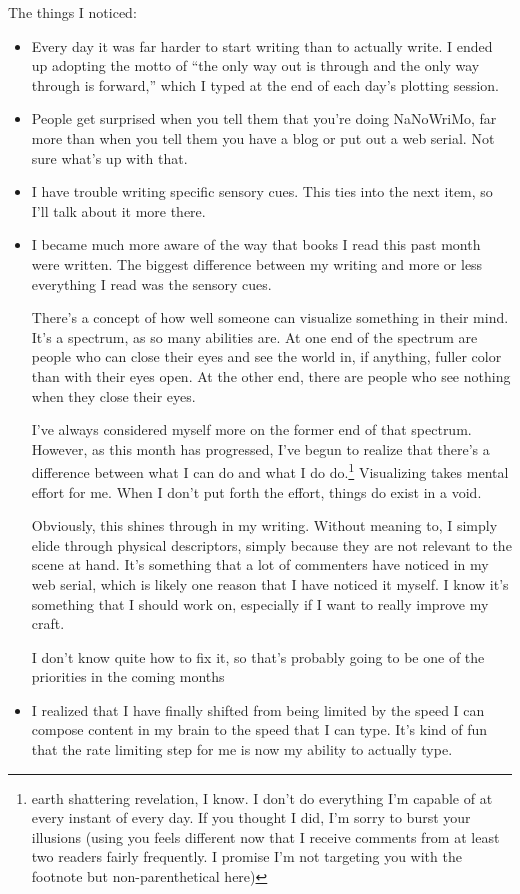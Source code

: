 \documentclass[12pt]{article}[titlepage]
\newcommand{\say}[1]{``#1''}
\newcommand{\1}{\={a}}
\newcommand{\2}{\={e}}
\newcommand{\3}{\={\i}}
\newcommand{\4}{\=o}
\newcommand{\5}{\=u}
\newcommand{\6}{\={A}}
\renewcommand{\,}{\textsuperscript{,}}
\begin{document}
The things I noticed:
\begin{itemize}
\item Every day it was far harder to start writing than to actually write.
I ended up adopting the motto of \say{the only way out is through and the only way through is forward,} which I typed at the end of each day's plotting session.
\item People get surprised when you tell them that you're doing NaNoWriMo, far more than when you tell them you have a blog or put out a web serial. Not sure what's up with that.
\item I have trouble writing specific sensory cues. This ties into the next item, so I'll talk about it more there.
\item I became much more aware of the way that books I read this past month were written.
The biggest difference between my writing and more or less everything I read was the sensory cues.
 
There's a concept of how well someone can visualize something in their mind.
It's a spectrum, as so many abilities are.
At one end of the spectrum are people who can close their eyes and see the world in, if anything, fuller color than with their eyes open.
At the other end, there are people who see nothing when they close their eyes.
 
I've always considered myself more on the former end of that spectrum.
However, as this month has progressed, I've begun to realize that there's a difference between what I can do and what I do do.\footnote{earth shattering revelation, I know. I don't do everything I'm capable of at every instant of every day.
If you thought I did, I'm sorry to burst your illusions (using you feels different now that I receive comments from at least two readers fairly frequently. I promise I'm not targeting you with the footnote but non-parenthetical here)}
Visualizing takes mental effort for me.
When I don't put forth the effort, things do exist in a void.
 
Obviously, this shines through in my writing.
Without meaning to, I simply elide through physical descriptors, simply because they are not relevant to the scene at hand.
It's something that a lot of commenters have noticed in my web serial, which is likely one reason that I have noticed it myself.
I know it's something that I should work on, especially if I want to really improve my craft.
 
I don't know quite how to fix it, so that's probably going to be one of the priorities in the coming months
\item I realized that I have finally shifted from being limited by the speed I can compose content in my brain to the speed that I can type.
It's kind of fun that the rate limiting step for me is now my ability to actually type.
 

\end{itemize}
\end{document}
